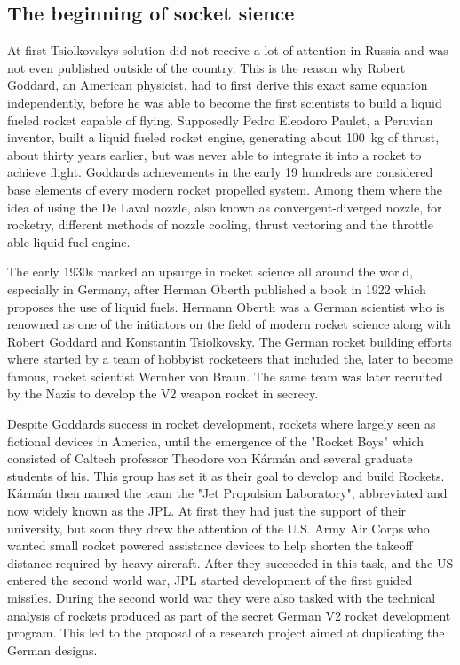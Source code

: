 \subsection{The beginning of socket sience}

At first Tsiolkovskys solution did not receive a lot of attention in Russia and was not even published outside of the country. This is the reason why Robert Goddard, an American physicist, had to first derive this exact same equation independently, before he was able to become the first scientists to build a liquid fueled rocket capable of flying. Supposedly Pedro Eleodoro Paulet, a Peruvian inventor, built a liquid fueled rocket engine, generating about \SI{100}{\kilo\gram} of thrust, about thirty years earlier, but was never able to integrate it into a rocket to achieve flight. Goddards achievements in the early 19 hundreds are considered base elements of every modern rocket propelled system. Among them where the idea of using the De Laval nozzle, also known as convergent-diverged nozzle, for rocketry, different methods of nozzle cooling, thrust vectoring and the throttle able liquid fuel engine.

The early 1930s marked an upsurge in rocket science all around the world, especially in Germany, after Herman Oberth published a book in 1922 which proposes the use of liquid fuels. Hermann Oberth was a German scientist who is renowned as one of the initiators on the field of modern rocket science along with Robert Goddard and Konstantin Tsiolkovsky. The German rocket building efforts where started by a team of hobbyist rocketeers that included the, later to become famous, rocket scientist Wernher von Braun. The same team was later recruited by the Nazis to develop the V2 weapon rocket in secrecy.

Despite Goddards success in rocket development, rockets where largely seen as fictional devices in America, until the emergence of the "Rocket Boys" which consisted of Caltech professor Theodore von Kármán and several graduate students of his. This group has set it as their goal to develop and build Rockets. Kármán then named the team the "Jet Propulsion Laboratory", abbreviated and now widely known as the JPL. At first they had just the support of their university, but soon they drew the attention of the U.S. Army Air Corps who wanted small rocket powered assistance devices to help shorten the takeoff distance required by heavy aircraft. After they succeeded in this task, and the US entered the second world war, JPL started development of the first guided missiles. During the second world war they were also tasked with the technical analysis of rockets produced as part of the secret German V2 rocket development program. This led to the proposal of a research project aimed at duplicating the German designs.

